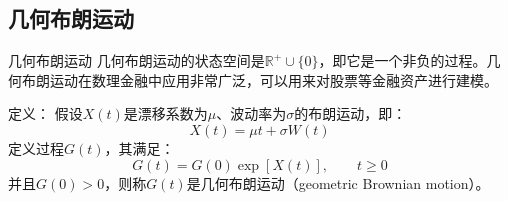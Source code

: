 \documentclass[t]{beamer}
\begin{document}
\subsection{几何布朗运动}
\begin{frame}{几何布朗运动}
  几何布朗运动的状态空间是$\mathbb{R}^+\cup\{0\}$，即它是一个非负的过程。几何布朗运动在数理金融中应用非常广泛，可以用来对股票等金融资产进行建模。
\normalsize
  \begin{block}{定义：}
    假设$X(t)$是漂移系数为$\mu$、波动率为$\sigma$的布朗运动，即：
    \[X(t)=\mu t+\sigma W(t) \]
    定义过程$G(t)$，其满足：
    \begin{equation*}
    G(t)=G(0)\exp[X(t)],\qquad t\ge 0
    \end{equation*}
    并且$G(0)>0$，则称$G(t)$是几何布朗运动（geometric Brownian motion）。 
  \end{block}
\end{frame}
\end{document}

